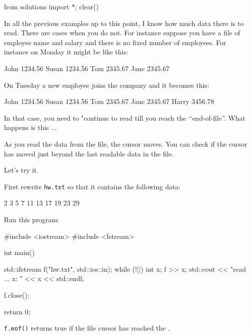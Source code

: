 \begin{python0}
from solutions import *; clear()
\end{python0}

In all the previous examples up to this point, I know how much data
there is to read. There are cases when you do not. For instance suppose
you have a file of employee name and salary and there is no fixed number
of employees. For instance on Monday it might be like this:

\begin{console}
John 1234.56
Susan 1234.56
Tom 2345.67
Jane 2345.67
\end{console}

On Tuesday a new employee joins the company and it becomes this:

\begin{console}
John 1234.56
Susan 1234.56
Tom 2345.67
Jane 2345.67
Harry 3456.78
\end{console}

In that case, you need to "continue to read till you reach the \lq\lq end-of-file''. What happens is this ...

As you read the data from the file, the cursor moves. You can check if the cursor has moved just beyond the last readable data in the file.

Let's try it.

First rewrite \texttt{hw.txt} so that it contains the following data:

\begin{console}
2 3 5 7
11
13
17
19
23
29
\end{console}

Run this program:

\begin{consolethree}[escapeinside=||]
#include <iostream>
#include <fstream>

int main()
{   
    std::ifstream f("hw.txt", std::ios::in);    
    while (!||)
    {     
         int x;
         f >> x;
         std::cout << "read ... x: " << x
                   << std::endl;
    }

    f.close();

    return 0;
}
\end{consolethree}

\texttt{f.eof()} returns true if the file cursor has reached the .

